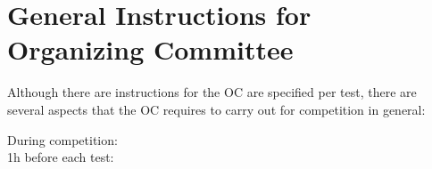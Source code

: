 \section{General Instructions for Organizing Committee}
\label{sec:oc_general_instructions}

Although there are instructions for the OC are specified per test, there are several aspects that the OC requires to carry out for competition in general:
\begin{description}
	\item[During competition:] \hfill
	\item[1h before each test:] \hfill
\end{description}